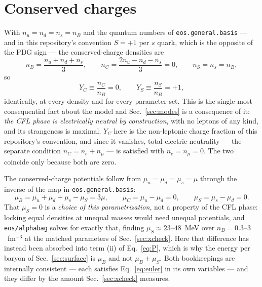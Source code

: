 \documentclass[aps,prc,onecolumn,superscriptaddress,nofootinbib,10pt]{revtex4-2}
\newcommand{\nB}{n_B}
\newcommand{\nC}{n_C}
\newcommand{\nS}{n_S}
\newcommand{\muB}{\mu_B}
\newcommand{\muC}{\mu_C}
\newcommand{\muS}{\mu_S}
\begin{document}
\section{Conserved charges}
\label{sec:charges}

With $n_u = n_d = n_s = \nB$ and the quantum numbers of
\texttt{eos.general.basis} --- and in this repository's convention
$S = +1$ per $s$ quark, which is the opposite of the PDG sign --- the
conserved-charge densities are
%
\begin{equation}
\nB = \frac{n_u + n_d + n_s}{3} , \qquad
\nC = \frac{2 n_u - n_d - n_s}{3} = 0 , \qquad
\nS = n_s = \nB ,
\label{eq:charges}
\end{equation}
%
so
%
\begin{equation}
Y_C \equiv \frac{\nC}{\nB} = 0 , \qquad
Y_S \equiv \frac{\nS}{\nB} = +1 ,
\label{eq:fractions}
\end{equation}
%
identically, at every density and for every parameter set. This is the single
most consequential fact about the model and Sec.~\ref{sec:modes} is a
consequence of it: \emph{the CFL phase is electrically neutral by
construction}, with no leptons of any kind, and its strangeness is maximal.
$Y_C$ here is the non-leptonic charge fraction of this repository's
convention, and since it vanishes, total electric neutrality --- the separate
condition $\nC = n_e + n_\mu$ --- is satisfied with $n_e = n_\mu = 0$. The two
coincide only because both are zero.

The conserved-charge potentials follow from
$\mu_u = \mu_d = \mu_s = \mu$ through the inverse of the map in
\texttt{eos.general.basis}:
%
\begin{equation}
\muB = \mu_u + \mu_d + \mu_s - \muS = 3\mu , \qquad
\muC = \mu_u - \mu_d = 0 , \qquad
\muS = \mu_s - \mu_d = 0 .
\label{eq:potentials}
\end{equation}
%
That $\muS = 0$ is a \emph{choice of this parametrization}, not a property of
the CFL phase: locking equal densities at unequal masses would need unequal
potentials, and \texttt{eos/alphabag} solves for exactly that, finding
$\muS \approx 23$--$48$~MeV over $\nB = 0.3$--$3$~fm$^{-3}$ at the matched
parameters of Sec.~\ref{sec:xcheck}. Here that difference has instead been
absorbed into term (ii) of Eq.~\eqref{eq:P}, which is why the energy per
baryon of Sec.~\ref{sec:surface} is $\muB$ and not $\muB + \muS$. Both
bookkeepings are internally consistent --- each satisfies
Eq.~\eqref{eq:euler} in its own variables --- and they differ by the amount
Sec.~\ref{sec:xcheck} measures.
\end{document}
